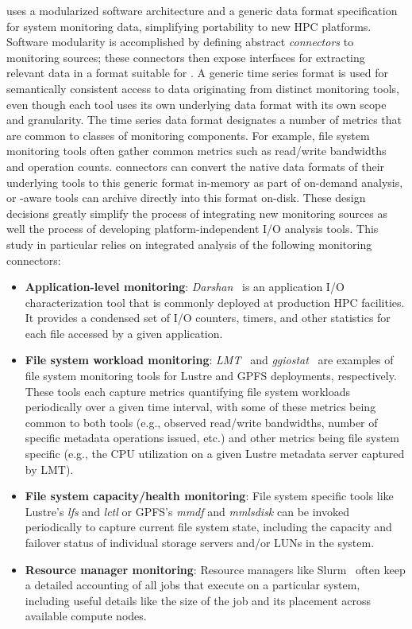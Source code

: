 \tokio uses a modularized software architecture and a generic data format
specification for system monitoring data, simplifying portability to new HPC
platforms. Software modularity is accomplished by defining abstract
\textit{connectors} to monitoring sources; these connectors then expose interfaces for
extracting relevant data in a format suitable for \tokio.  A generic
time series format is used for semantically consistent access to data
originating from distinct monitoring tools, even though each tool uses its
own underlying data format with its own scope and granularity.
The time series data format designates a number of metrics
that are common to classes of monitoring components.  For example, file system
monitoring tools often gather common metrics such as read/write bandwidths
and operation counts. \tokio connectors can convert the native data formats
of their underlying tools to this generic format in-memory as part of
on-demand analysis, or \tokio-aware tools can archive directly into this
format on-disk. These design decisions greatly simplify the process of
integrating new monitoring sources as well the process of developing
platform-independent I/O analysis tools.  This study in particular relies on
integrated analysis of the following monitoring connectors:

\begin{itemize}[leftmargin=*]
\item \textbf{Application-level monitoring}: \textit{Darshan}~\cite{Carns2009} is an application I/O characterization tool that is commonly deployed at production HPC facilities. It provides a condensed set of I/O counters, timers, and other statistics for each file accessed by a given application.

\item \textbf{File system workload monitoring}: \textit{LMT}~\cite{lmt} and \textit{ggiostat}~\cite{Lockwood2017} are examples of 
file system monitoring tools for Lustre and GPFS deployments, respectively. These tools each capture metrics quantifying file system workloads periodically over a given time interval, with some of these metrics being common to both tools (e.g., observed read/write bandwidths, number of specific metadata operations issued, etc.) and other metrics being file system specific (e.g., the CPU utilization on a given Lustre metadata server captured by LMT).

\item \textbf{File system capacity/health monitoring}: File system specific tools like Lustre's \textit{lfs} and \textit{lctl} or GPFS's \textit{mmdf} and \textit{mmlsdisk} can be invoked periodically to capture current file system state, including the capacity and failover status of individual storage servers and/or LUNs in the system.

\item \textbf{Resource manager monitoring}: Resource managers like Slurm~\cite{2003slurm} often keep a detailed accounting of all jobs that execute on a particular system, including useful details like the size of the job and its placement across available compute nodes.
\end{itemize}

